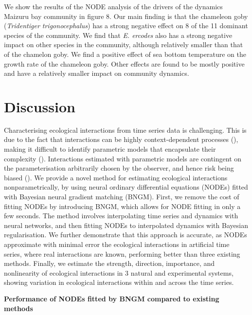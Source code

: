 \documentclass[11pt, oneside]{article}
\begin{document}
We show the results of the NODE analysis of the drivers of the dynamics Maizuru bay community in figure 8.
Our main finding is that the chameleon goby (\textit{Tridentiger trigonocephalus}) has a strong negative effect on 8 of the 11 dominant species of the community. 
We find that \textit{E. ercodes} also has a strong negative impact on other species in the community, although relatively smaller than that of the chamelon goby.
We find a positive effect of sea bottom temperature on the growth rate of the chameleon goby.
Other effects are found to be mostly positive and have a relatively smaller impact on community dynamics.

\section{Discussion}

Characterising ecological interactions from time series data is challenging.
This is due to the fact that interactions can be highly context-dependent processes (\cite{Song2021}), making it difficult to identify parametric models that encapsulate their complexity (\cite{Wood2001}).
Interactions estimated with parametric models are contingent on the parameterisation arbitrarily chosen by the observer, and hence risk being biased (\cite{Wood2001,Adamson2013}).
We provide a novel method for estimating ecological interactions nonparametrically, by using neural ordinary differential equations (NODEs) fitted with Bayesian neural gradient matching (BNGM). 
First, we remove the cost of fitting NODEs by introducing BNGM, which allows for NODE fitting in only a few seconds. 
The method involves interpolating time series and dynamics with neural networks, and then fitting NODEs to interpolated dynamics with Bayesian regularisation.
We further demonstrate that this approach is accurate, as NODEs approximate with minimal error the ecological interactions in artificial time series, where real interactions are known, performing better than three existing methods. 
Finally, we estimate the strength, direction, importance, and nonlinearity of ecological interactions in 3 natural and experimental systems, showing variation in ecological interactions within and across the time series.

\textbf{Performance of NODEs fitted by BNGM compared to existing methods}
\end{document}
